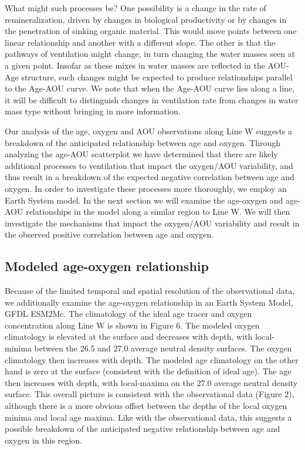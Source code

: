 \documentclass{ametsoc}
\begin{document}
What might such processes be? One possibility is a change in the rate of remineralization, driven by changes in biological productivity or by changes in the penetration of sinking organic material. This would move points between one linear relationship and another with a different slope. The other is that the pathways of ventilation might change, in turn changing the water masses seen at a given point. Insofar as these mixes in water masses are reflected in the AOU-Age structure, such changes might be expected to produce relationships parallel to the Age-AOU curve. We note that when the Age-AOU curve lies along a line, it will be difficult to distinguish changes in ventilation rate from changes in water mass type without bringing in more information.

Our analysis of the age, oxygen and AOU observations along Line W suggests a breakdown of the anticipated relationship between age and oxygen. Through analyzing the age-AOU scatterplot we have determined that there are likely additional processes to ventilation that impact the oxygen/AOU variability, and thus result in a breakdown of the expected negative correlation between age and oxygen. In order to investigate these processes more thoroughly, we employ an Earth System model. In the next section we will examine the age-oxygen and age-AOU relationships in the model along a similar region to Line W. We will then investigate the mechanisms that impact the oxygen/AOU variability and result in the observed positive correlation between age and oxygen.

\subsection{Modeled age-oxygen relationship}

Because of the limited temporal and spatial resolution of the observational data, we additionally examine the age-oxygen relationship in an Earth System Model, GFDL ESM2Mc. The climatology of the ideal age tracer and oxygen concentration along Line W is shown in Figure 6. The modeled oxygen climatology is elevated at the surface and decreases with depth, with local-minima between the 26.5 and 27.0 average neutral density surfaces. The oxygen climatology then increases with depth. The modeled age climatology on the other hand is zero at the surface (consistent with the definition of ideal age). The age then increases with depth, with local-maxima on the 27.0 average neutral density surface. This overall picture is consistent with the observational data (Figure 2), although there is a more obvious offset between the depths of the local oxygen minima and local age maxima. Like with the observational data, this suggests a possible breakdown of the anticipated negative relationship between age and oxygen in this region.
\end{document}
